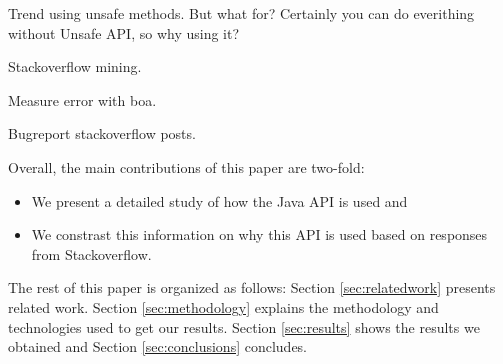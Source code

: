 Trend using unsafe methods. But what for? Certainly you can do everithing without Unsafe API, so why using it? 

 
Stackoverflow mining.

Measure error with boa.


Bugreport stackoverflow posts.


Overall, the main contributions of this paper are two-fold:
\begin{itemize}
\item We present a detailed study of how the Java \smu{} API is used and
\item We constrast this information on why this API is used based on responses from Stackoverflow.
\end{itemize}

The rest of this paper is organized as follows:
Section \ref{sec:relatedwork} presents related work.
Section \ref{sec:methodology} explains the methodology and technologies used to get our results.
Section \ref{sec:results} shows the results we obtained and Section \ref{sec:conclusions} concludes.
